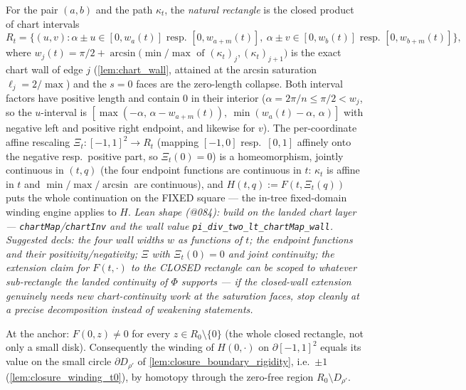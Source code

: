 \begin{definition}
  \label{def:closing_rect}
  \leanok
  For the pair $(a,b)$ and the path $\kappa_t$, the \emph{natural rectangle}
  is the closed product of chart intervals
  \[
    R_t = \bigl\{(u,v) : \alpha \pm u \in [0, w_{a}(t)] \text{ resp. }
    [0,w_{a+m}(t)],\ \alpha \pm v \in [0, w_b(t)] \text{ resp. }
    [0,w_{b+m}(t)]\bigr\},
  \]
  where $w_j(t) = \pi/2 + \arcsin\bigl(\min/\max \text{ of }
  (\kappa_t)_j, (\kappa_t)_{j+1}\bigr)$ is the exact chart wall of edge $j$
  (\cref{lem:chart_wall}, attained at the arcsin saturation $\ell_j = 2/\max$)
  and the $s = 0$ faces are the zero-length collapse. Both interval factors
  have positive length and contain $0$ in their interior
  ($\alpha = 2\pi/n \le \pi/2 < w_j$, so the $u$-interval is
  $[\max(-\alpha,\, \alpha - w_{a+m}(t)),\ \min(w_a(t) - \alpha,\, \alpha)]$
  with negative left and positive right endpoint, and likewise for $v$). The
  per-coordinate affine rescaling $\Xi_t : [-1,1]^2 \to R_t$ (mapping
  $[-1,0]$ resp.\ $[0,1]$ affinely onto the negative resp.\ positive part, so
  $\Xi_t(0) = 0$) is a homeomorphism, jointly continuous in $(t,q)$ (the four
  endpoint functions are continuous in $t$: $\kappa_t$ is affine in $t$ and
  $\min/\max/\arcsin$ are continuous), and
  $H(t,q) := F(t, \Xi_t(q))$ puts the whole continuation on the FIXED square
  --- the in-tree fixed-domain winding engine applies to $H$.
  \emph{Lean shape (@084): build on the landed chart layer ---
  \texttt{chartMap}/\texttt{chartInv} and the wall value
  \texttt{pi\_div\_two\_lt\_chartMap\_wall}. Suggested decls: the four wall
  widths $w$ as functions of $t$; the endpoint functions and their
  positivity/negativity; $\Xi$ with $\Xi_t(0) = 0$ and joint continuity; the
  extension claim for $F(t,\cdot)$ to the CLOSED rectangle can be scoped to
  whatever sub-rectangle the landed continuity of $\Phi$ supports --- if the
  closed-wall extension genuinely needs new chart-continuity work at the
  saturation faces, stop cleanly at a precise decomposition instead of
  weakening statements.}
\end{definition}

\begin{lemma}[global $t = 0$ window rigidity --- companion, OPEN]
  \label{lem:closure_window_rigidity}
  At the anchor: $F(0,z) \ne 0$ for every $z \in R_0 \setminus \{0\}$ (the
  whole closed rectangle, not only a small disk). Consequently the winding of
  $H(0,\cdot)$ on $\partial[-1,1]^2$ equals its value on the small circle
  $\partial D_{\rho'}$ of \cref{lem:closure_boundary_rigidity}, i.e.\ $\pm1$
  (\cref{lem:closure_winding_t0}), by homotopy through the zero-free region
  $R_0 \setminus D_{\rho'}$.
\end{lemma}

